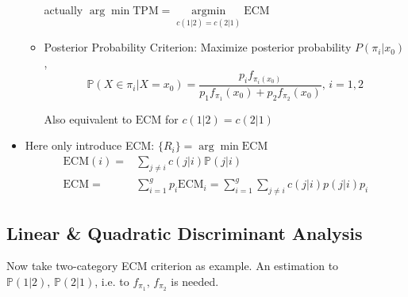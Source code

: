 \begin{itemize}[topsep=2pt,itemsep=2pt]
\begin{itemize}[topsep=2pt,itemsep=2pt]
    actually $ \arg\min\mathrm{TPM}=\mathop{\arg\min}\limits_{c(1|2)=c(2|1)} \mathrm{ECM} $
    \item Posterior Probability Criterion: Maximize posterior probability $ P(\pi_i|x_0) $,
    \begin{equation}
        \mathbb{P}(X\in\pi_i|X=x_0)=\dfrac{p_i f_{\pi_i(x_0)}}{p_1f_{\pi_1}(x_0)+p_2f_{\pi_2}(x_0)},\, i=1,2
    \end{equation}
    
    Also equivalent to $ \mathrm{ECM} $ for $ c(1|2)=c(2|1) $
\end{itemize}
    \item Here only introduce ECM: $ \{R_i\}=\arg\min\mathrm{ECM} $
    \begin{align}
        \mathrm{ECM}(i)=&\sum_{j\neq i}c(j|i)\mathbb{P}(j|i)\\
        \mathrm{ECM}=&\sum_{i=1}^gp_i\mathrm{ECM}_i=\sum_{i=1}^g\sum_{j\neq i} c(j|i)p(j|i)p_i
    \end{align}
\end{itemize}

    
    




    
\subsection{Linear \& Quadratic Discriminant Analysis}
    Now take two-category ECM criterion as example. An estimation to $ \mathbb{P}(1|2),\,\mathbb{P}(2|1) $, i.e. to $ f_{\pi_1},\,f_{\pi_2} $ is needed.

